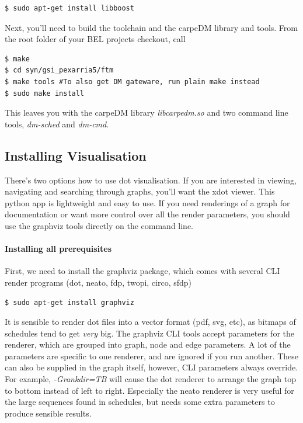 \begin{lstlisting}[style = customshell]
$ sudo apt-get install libboost
\end{lstlisting}

Next, you'll need to build the toolchain and the carpeDM library and tools. From the root folder of your BEL projects checkout, call
%
\begin{lstlisting}[style = customshell]
$ make
$ cd syn/gsi_pexarria5/ftm
$ make tools #To also get DM gateware, run plain make instead
$ sudo make install
\end{lstlisting}
%
This leaves you with the carpeDM library \emph{libcarpedm.so} and two command line tools, \emph{dm-sched} and \emph{dm-cmd}.

\subsection{Installing Visualisation}

There's two options how to use dot visualisation. If you are interested in viewing, navigating and searching through graphs, you'll want the xdot viewer. This python app is lightweight and easy to use.
If you need renderings of a graph for documentation or want more control over all the render parameters, you should use the graphviz tools directly on the command line.

\paragraph{Installing all prerequisites}
First, we need to install the graphviz package, which comes with several CLI render programs (dot, neato, fdp, twopi, circo, sfdp) 

\begin{lstlisting}[style = customshell]
$ sudo apt-get install graphviz
\end{lstlisting}

It is sensible to render dot files into a vector format (pdf, svg, etc), as bitmaps of schedules tend to get \emph{very} big. The graphviz CLI tools accept parameters for the renderer, which are grouped
into graph, node and edge parameters. A lot of the parameters are specific to one renderer, and are ignored if you run another. These can also be supplied in the graph itself, however, CLI parameters always override. For example, \emph{-Grankdir=TB} will cause the dot renderer to arrange the graph top to bottom instead of left to right. Especially the neato renderer is very useful for the large sequences found in schedules, but needs some extra parameters to produce sensible results.

